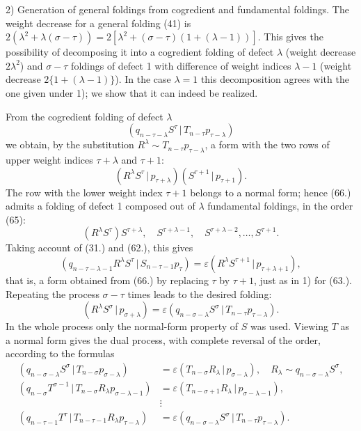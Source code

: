 \documentclass[11pt]{article}
\providecommand{\pair}[2]{(#1\,|\,#2)}
\providecommand{\eps}{\varepsilon}
\begin{document}
2) Generation of general foldings from cogredient and fundamental foldings. The weight decrease for a general folding (41) is $2(\lambda^2+\lambda(\sigma-\tau))=2[\lambda^2+(\sigma-\tau)(1+(\lambda-1))]$. This gives the possibility of decomposing it into a cogredient folding of defect $\lambda$ (weight decrease $2\lambda^2$) and $\sigma-\tau$ foldings of defect 1 with difference of weight indices $\lambda-1$ (weight decrease $2\{1+(\lambda-1)\}$). In the case $\lambda=1$ this decomposition agrees with the one given under 1); we show that it can indeed be realized.

From the cogredient folding of defect $\lambda$
\[
 \pair{q_{n-\tau-\lambda}S^\tau}{T_{n-\tau}p_{\tau-\lambda}}
\]
we obtain, by the substitution $R^\lambda\sim T_{n-\tau}p_{\tau-\lambda}$, a form with the two rows of upper weight indices $\tau+\lambda$ and $\tau+1$:
\begin{equation}
 \pair{R^\lambda S^\tau}{p_{\tau+\lambda}}\pair{S^{\tau+1}}{p_{\tau+1}}.
\tag{66}
\end{equation}
The row with the lower weight index $\tau+1$ belongs to a normal form; hence (66.) admits a folding of defect 1 composed out of $\lambda$ fundamental foldings, in the order (65):
\[
 (R^\lambda S^\tau)S^{\tau+\lambda},\quad S^{\tau+\lambda-1},\quad S^{\tau+\lambda-2},\ldots,S^{\tau+1}.
\]
Taking account of (31.) and (62.), this gives
\[
 \pair{q_{n-\tau-\lambda-1}R^\lambda S^\tau}{S_{n-\tau-1}p_\tau}=\eps\pair{R^\lambda S^{\tau+1}}{p_{\tau+\lambda+1}},
\]
that is, a form obtained from (66.) by replacing $\tau$ by $\tau+1$, just as in 1) for (63.). Repeating the process $\sigma-\tau$ times leads to the desired folding:
\[
 \pair{R^\lambda S^\sigma}{p_{\sigma+\lambda}}=\eps\pair{q_{n-\sigma-\lambda}S^\sigma}{T_{n-\tau}p_{\tau-\lambda}}.
\]
In the whole process only the normal-form property of $S$ was used. Viewing $T$ as a normal form gives the dual process, with complete reversal of the order, according to the formulas
\begin{align*}
\pair{q_{n-\sigma-\lambda}S^\sigma}{T_{n-\sigma}p_{\sigma-\lambda}}&=\eps\pair{T_{n-\sigma}R_\lambda}{p_{\sigma-\lambda}},\quad R_\lambda\sim q_{n-\sigma-\lambda}S^\sigma,\\
\pair{q_{n-\sigma}T^{\sigma-1}}{T_{n-\sigma}R_\lambda p_{\sigma-\lambda-1}}&=\eps\pair{T_{n-\sigma+1}R_\lambda}{p_{\sigma-\lambda-1}},\\
&\vdots\\
\pair{q_{n-\tau-1}T^\tau}{T_{n-\tau-1}R_\lambda p_{\tau-\lambda}}&=\eps\pair{q_{n-\sigma-\lambda}S^\sigma}{T_{n-\tau}p_{\tau-\lambda}}.
\end{align*}
\end{document}
